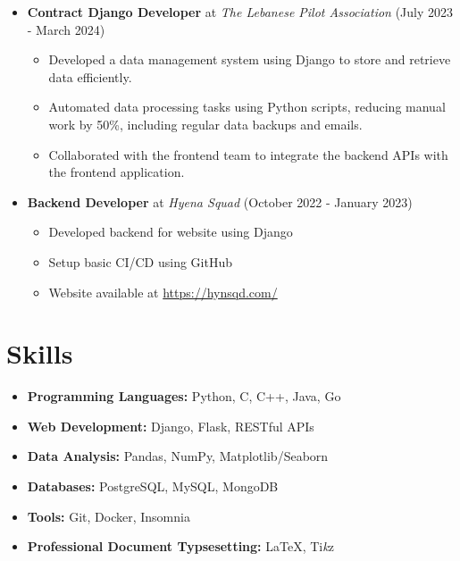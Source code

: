 \documentclass[11pt]{scrartcl}
\begin{document}
\begin{itemize}
	\item \textbf{Contract Django Developer} at \emph{The Lebanese Pilot Association} \hfill (July 2023 - March 2024)
	      \begin{tcolorbox}[leftrule=1mm,toprule=-0.5mm,bottomrule=-0.5mm, rightrule=-0.5mm, left=1mm,sharp corners]
		      \begin{itemize}[leftmargin=5mm]
			      \item Developed a data management system using Django to store and retrieve data efficiently.
			      \item Automated data processing tasks using Python scripts, reducing manual work by 50\%, including regular data backups and emails.
			      \item Collaborated with the frontend team to integrate the backend APIs with the frontend application.
		      \end{itemize}
	      \end{tcolorbox}
	\item \textbf{Backend Developer} at \emph{Hyena Squad} \hfill (October 2022 - January 2023)
	      \begin{tcolorbox}[leftrule=1mm,toprule=-0.5mm,bottomrule=-0.5mm, rightrule=-0.5mm, left=1mm,sharp corners]
		      \begin{itemize}[leftmargin=5mm]
			      \item Developed backend for website using Django
			      \item Setup basic CI/CD using GitHub
			      \item Website available at \url{https://hynsqd.com/}
		      \end{itemize}
	      \end{tcolorbox}
\end{itemize}

\section*{Skills}

\begin{itemize}[itemsep=0.5mm]
	\item \textbf{Programming Languages:} Python, C, C++, Java, Go
	\item \textbf{Web Development:} Django, Flask, RESTful APIs
	\item \textbf{Data Analysis:} Pandas, NumPy, Matplotlib/Seaborn
	\item \textbf{Databases:} PostgreSQL, MySQL, MongoDB
	\item \textbf{Tools:} Git, Docker, Insomnia
	\item \textbf{Professional Document Typsesetting:} \LaTeX, Ti\textit{k}z
\end{itemize}
\end{document}
